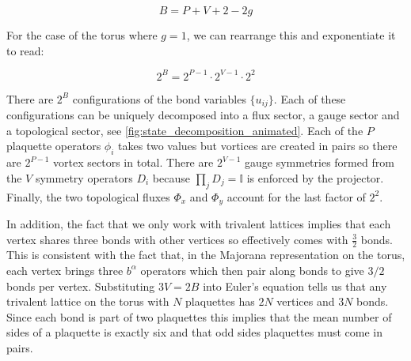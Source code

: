 \[B = P + V + 2 - 2g\]

For the case of the torus where \(g = 1\), we can rearrange this and exponentiate it to read:

\[2^B = 2^{P-1}\cdot 2^{V-1} \cdot 2^2\]

There are \(2^B\) configurations of the bond variables \(\{u_{ij}\}\). Each of these configurations can be uniquely decomposed into a flux sector, a gauge sector and a topological sector, see \cref{fig:state_decomposition_animated}. Each of the \(P\) plaquette operators \(\phi_i\) takes two values but vortices are created in pairs so there are \(2^{P-1}\) vortex sectors in total. There are \(2^{V-1}\) gauge symmetries formed from the \(V\) symmetry operators \(D_i\) because \(\prod_{j} D_j = \mathbb{I}\) is enforced by the projector. Finally, the two topological fluxes \(\Phi_x\) and \(\Phi_y\) account for the last factor of \(2^2\).

In addition, the fact that we only work with trivalent lattices implies that each vertex shares three bonds with other vertices so effectively comes with \(\tfrac{3}{2}\) bonds. This is consistent with the fact that, in the Majorana representation on the torus, each vertex brings three \(b^\alpha\) operators which then pair along bonds to give \(3/2\) bonds per vertex. Substituting \(3V = 2B\) into Euler's equation tells us that any trivalent lattice on the torus with \(N\) plaquettes has \(2N\) vertices and \(3N\) bonds. Since each bond is part of two plaquettes this implies that the mean number of sides of a plaquette is exactly six and that odd sides plaquettes must come in pairs.
